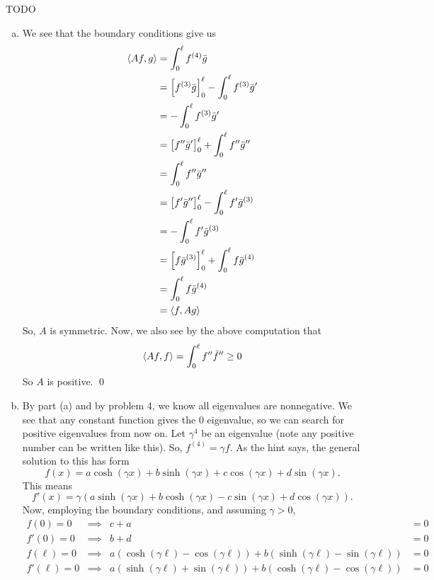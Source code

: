 \documentclass{article}
\begin{document}
\newpage
{} TODO
 \tri
\hop 
\solution
\begin{enumerate}[(a)]
    \item We see that the boundary conditions give us 
    \begin{align*}
        \ang{Af, g} &= \int_0^\ell f^{(4)}\bar{g}\\
        &= \sbr{f^{(3)}\bar{g}}_0^\ell - \int_0^\ell f^{(3)}\bar{g}' \\
        &=  - \int_0^\ell f^{(3)}\bar{g}' \\
        &= \sbr{f''\bar{g}'}_0^\ell + \int_0^\ell f''\bar{g}'' \\
        &= \int_0^\ell f''\bar{g}'' \\
        &= \sbr{f'\bar{g}''}_0^\ell - \int_0^\ell f'\bar{g}^{(3)} \\
        &= - \int_0^\ell f'\bar{g}^{(3)} \\
        &=  \sbr{f\bar{g}^{(3)}}_0^\ell + \int_0^\ell f\bar{g}^{(4)} \\
        &= \int_0^\ell f\bar{g}^{(4)} \\
        &= \ang{f, Ag}
    \end{align*}
    So, $A$ is symmetric. Now, we also see by the above computation that 
    \begin{align*}
        \langle Af,f\rangle = \int_0^\ell f''\bar{f}'' \ge 0 
    \end{align*}
    So $A$ is positive. \qed
    \item By part (a) and by problem 4, we know all eigenvalues are nonnegative. We see that any constant function gives the 0 eigenvalue, so we can search for positive eigenvalues from now on. Let $\gamma^4$ be an eigenvalue (note any positive number can be written like this). %
     So, $f^{(4)} = \gamma f$. As the hint says, the general solution to this has form 
     \[f(x) = a \cosh(\gamma x) + b\sinh(\gamma x) + c \cos(\gamma x) +d \sin(\gamma x).\]
    This means 
    \[f'(x) = \gamma(a\sinh(\gamma x)+b\cosh(\gamma x) - c \sin(\gamma x) + d \cos(\gamma x)).\]
    Now, employing the boundary conditions, and assuming $\gamma > 0$,
    \begin{align*}
        f(0) = 0 &\implies &c+a &= 0\\
        f'(0) = 0 &\implies &b+d &= 0\\
        f(\ell) = 0 &\implies &a(\cosh(\gamma\ell)-\cos(\gamma\ell)) + b(\sinh(\gamma\ell)-\sin(\gamma\ell)) &= 0\\
        f'(\ell) = 0 &\implies &a(\sinh(\gamma\ell)+\sin(\gamma\ell)) + b(\cosh(\gamma\ell)-\cos(\gamma\ell)) &= 0

\end{align*}
\end{enumerate}
\end{document}
